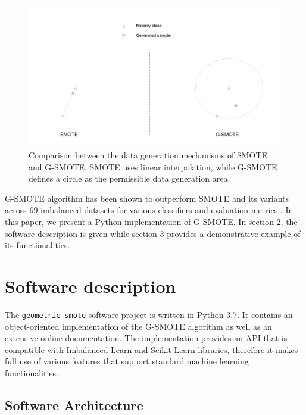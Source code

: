 \documentclass[preprint,12pt, a4paper]{elsarticle}
\begin{document}
\begin{figure}[H]
	\centering
	\includegraphics[width=1\linewidth]{../analysis/smote_vs_gsmote}
	\caption{Comparison between the data generation mechanisms of SMOTE and G-SMOTE. SMOTE uses linear interpolation, while G-SMOTE defines a circle as the permissible data generation area.}
	\label{fig:smote_vs_gsmote}
\end{figure}

G-SMOTE algorithm has been shown to outperform SMOTE and its variants across 69 imbalanced datasets for various classifiers and evaluation metrics \cite{Douzas2019}. In this paper, we present a Python implementation of G-SMOTE. In section 2, the software description is given while section 3 provides a demonstrative example of its functionalities.

\section{Software description}

The \texttt{geometric-smote} software project is written in Python 3.7. It contains an object-oriented implementation of the G-SMOTE algorithm as well as an extensive \href{https://geometric-smote.readthedocs.io/}{online documentation}. The implementation provides an API that is compatible with Imbalanced-Learn and Scikit-Learn libraries, therefore it makes full use of various features that support standard machine learning functionalities.

\subsection{Software Architecture}
\label{architecture}
\end{document}
